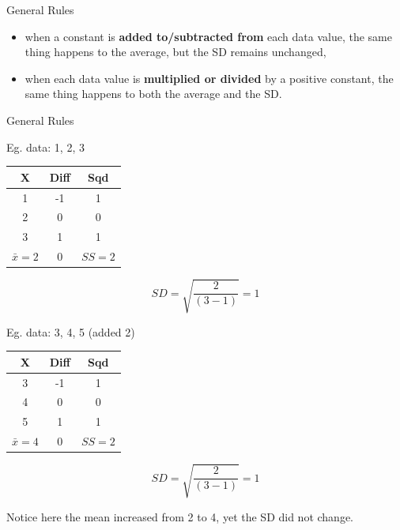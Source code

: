 \documentclass[14pt]{beamer}\usepackage[]{graphicx}\usepackage[]{color}
\begin{document}
\begin{frame}[fragile]{General Rules}

\begin{itemize}
\item<1-> when a constant is \textbf{added to/subtracted from} each data  value, the same thing happens to the average, but the SD  remains unchanged,
\item<2-> when each data value is \textbf{multiplied or divided} by a positive  constant, the same thing happens to both the average and  the SD.
\end{itemize}
\end{frame}

\begin{frame}[fragile]{General Rules}

\begin{minipage}[ht]{5cm}

{\small{
Eg. data: 1, 2, 3

\begin{tabular}{@{} ccc @{}} \hline
X & Diff & Sqd \\ \hline
1 & -1 & 1 \\
2 & 0 & 0 \\
3 & 1 & 1 \\ \hline
$\bar{x}=2$ & 0 & $SS=2$ \\ \hline
\end{tabular}

\begin{equation*}
SD = \sqrt{ \frac{2}{(3-1)}} = 1
\end{equation*}
}}
\end{minipage}
\begin{minipage}[ht]{5cm}
{\small{
Eg. data: 3, 4, 5 (added 2)

\begin{tabular}{@{} ccc @{}} \hline
X & Diff & Sqd \\ \hline
3 & -1 & 1 \\
4 & 0 & 0 \\
5 & 1 & 1 \\ \hline
$\bar{x}=4$ & 0 & $SS=2$ \\ \hline
\end{tabular}

\begin{equation*}
SD = \sqrt{ \frac{2}{(3-1)}} = 1
\end{equation*}
}}
\end{minipage}

Notice here the mean increased from 2 to 4, yet the SD did not change.

\end{frame}
\end{document}
